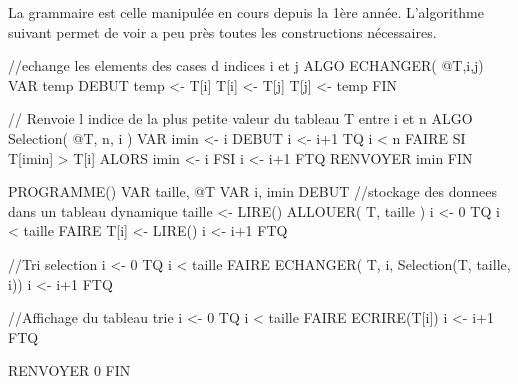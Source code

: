 \documentclass[a4paper,10pt, oneside]{article}
\begin{document}
La grammaire est celle manipulée en cours depuis la 1ère
année. L'algorithme suivant permet de voir a peu près toutes les
constructions nécessaires.

\begin{algo}
//echange les elements des cases d indices i et j
ALGO ECHANGER( @T,i,j)
VAR temp
DEBUT
	temp <- T[i]
	T[i] <- T[j]
	T[j] <- temp
FIN

// Renvoie l indice de la plus petite valeur du tableau T entre i et n	
ALGO Selection( @T, n, i )
VAR imin <- i
DEBUT
	i <- i+1
	TQ i < n FAIRE
	   SI T[imin] > T[i] ALORS
	      imin <- i
	   FSI
	   i <- i+1
	FTQ
	RENVOYER imin
FIN

PROGRAMME()
VAR taille, @T
VAR i, imin
DEBUT
	//stockage des donnees dans un tableau dynamique
	taille <- LIRE()
	ALLOUER( T, taille )
	i <- 0
	TQ i < taille FAIRE
	   T[i] <- LIRE()
	   i <- i+1
	FTQ

	//Tri selection
	i <- 0
	TQ i < taille FAIRE
	   ECHANGER( T, i, Selection(T, taille, i))
	   i <- i+1
	FTQ

	//Affichage du tableau trie
	i <- 0
	TQ i < taille FAIRE
	   ECRIRE(T[i])
	   i <- i+1
	FTQ
	
	RENVOYER 0
FIN
\end{algo}
\end{document}
